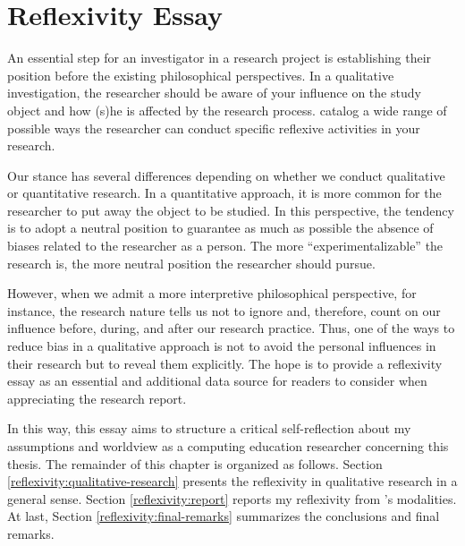 \chapter{Reflexivity Essay}
\label{chap:reflex-essay}

An essential step for an investigator in a research project is establishing their position before the existing philosophical perspectives. In a qualitative investigation, the researcher should be aware of your influence on the study object and how (s)he is affected by the research process.  catalog a wide range of possible ways the researcher can conduct specific reflexive activities in your research.

Our stance has several differences depending on whether we conduct qualitative or quantitative research. In a quantitative approach, it is more common for the researcher to put away the object to be studied. In this perspective, the tendency is to adopt a neutral position to guarantee as much as possible the absence of biases related to the researcher as a person. The more “experimentalizable” the research is, the more neutral position the researcher should pursue. 

However, when we admit a more interpretive philosophical perspective, for instance, the research nature tells us not to ignore and, therefore, count on our influence before, during, and after our research practice. Thus, one of the ways to reduce bias in a qualitative approach is not to avoid the personal influences in their research but to reveal them explicitly. The hope is to provide a reflexivity essay as an essential and additional data source for readers to consider when appreciating the research report.

In this way, this essay aims to structure a critical self-reflection about my assumptions and worldview as a computing education researcher concerning this thesis. The remainder of this chapter is organized as follows. Section \ref{reflexivity:qualitative-research} presents the reflexivity in qualitative research in a general sense. Section \ref{reflexivity:report} reports my reflexivity from 's modalities. %
At last, Section \ref{reflexivity:final-remarks} summarizes the conclusions and final remarks.
